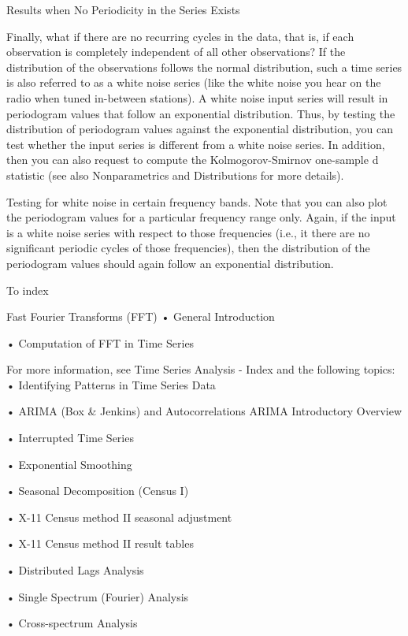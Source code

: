 Results when No Periodicity in the Series Exists

Finally, what if there are no recurring cycles in the data, that is, if each observation is completely independent of all other observations? If the distribution of the observations follows the normal distribution, such a time series is also referred to as a white noise series (like the white noise you hear on the radio when tuned in-between stations). A white noise input series will result in periodogram values that follow an exponential distribution. Thus, by testing the distribution of periodogram values against the exponential distribution, you can test whether the input series is different from a white noise series. In addition, then you can also request to compute the Kolmogorov-Smirnov one-sample d statistic (see also Nonparametrics and Distributions for more details).

Testing for white noise in certain frequency bands. Note that you can also plot the periodogram values for a particular frequency range only. Again, if the input is a white noise series with respect to those frequencies (i.e., it there are no significant periodic cycles of those frequencies), then the distribution of the periodogram values should again follow an exponential distribution.








To index
 


 

Fast Fourier Transforms (FFT)
•
General Introduction

•
Computation of FFT in Time Series


For more information, see Time Series Analysis - Index and the following topics:
•
Identifying Patterns in Time Series Data

•
ARIMA (Box & Jenkins) and Autocorrelations ARIMA Introductory Overview

•
Interrupted Time Series

•
Exponential Smoothing

•
Seasonal Decomposition (Census I)

•
X-11 Census method II seasonal adjustment

•
X-11 Census method II result tables

•
Distributed Lags Analysis

•
Single Spectrum (Fourier) Analysis

•
Cross-spectrum Analysis

